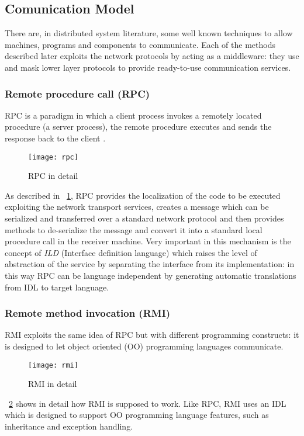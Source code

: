 \subsection{Comunication Model} \label{mpi}
\par
There are, in distributed system literature, some well known techniques to allow machines, programs and components to communicate. Each of the methods described later exploits the network protocols by acting as a middleware: they use and mask lower layer protocols to provide ready-to-use communication services.

\subsubsection{Remote procedure call (RPC)} RPC is a paradigm in which a client process invokes a remotely located procedure (a server process), the remote procedure executes and sends the response back to the client \cite{Jerome2009Principles}.
\begin{figure}[h]
	\centering
	\texttt{[image: rpc]}
	\caption{RPC in detail}
	\label{fig:2.10}
\end{figure} 
As described in \figurename~\ref{fig:2.10}, RPC provides the localization of the code to be executed exploiting the network transport services, creates a message which can be serialized and transferred over a standard network protocol and then provides methods to de-serialize the message and convert it into a standard local procedure call in the receiver machine. Very important in this mechanism is the concept of \textit{ILD} (Interface definition language) which raises the level of abstraction of the service by separating the interface from its implementation: in this way RPC can be language independent by generating automatic translations from IDL to target language.  
\subsubsection{Remote method invocation (RMI)} \label{RMI} RMI exploits the same idea of RPC but with different programming constructs: it is designed to let object oriented (OO) programming languages communicate.
\begin{figure}[h]
	\centering
	\texttt{[image: rmi]}
	\caption{RMI in detail}
	\label{fig:2.11}
\end{figure} 
\figurename~\ref{fig:2.11} shows in detail how RMI is supposed to work. Like RPC, RMI uses an IDL which is designed to support OO programming language features, such as inheritance and exception handling.
